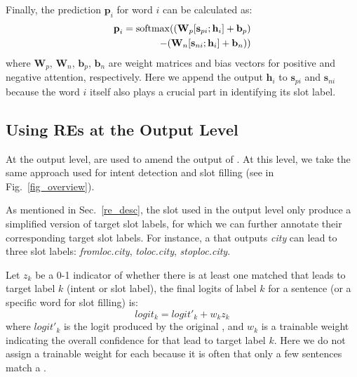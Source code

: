 Finally, the prediction $\textbf{p}_i$ for word $i$ can be calculated as:
\begin{equation}
\begin{split}
\textbf{p}_i = \operatorname{softmax}((\textbf{W}_p [\textbf{s}_{pi}; \textbf{h}_i] + \textbf{b}_p) \\- (\textbf{W}_n [\textbf{s}_{ni}; \textbf{h}_i] + \textbf{b}_n))
\end{split}
\end{equation}
where $\textbf{W}_{p}$, $\textbf{W}_{n}$, $\textbf{b}_{p}$, $\textbf{b}_{n}$ are weight matrices and bias vectors for positive and negative attention, respectively. Here we append the \BLSTM output $\textbf{h}_i$ to $\textbf{s}_{pi}$ and $\textbf{s}_{ni}$ because the word $i$ itself also plays a crucial part in identifying its slot label.

\subsection{Using REs at the Output Level}
\label{fusion_with_output} At the output level, \REs are used to amend the output of \NNs. At this level, we take the same approach used
for intent detection and slot filling (see  in Fig.~\ref{fig_overview}).


As mentioned in Sec.~\ref{re_desc}, the slot \REs used in the output level only produce a simplified version of target slot labels, for which
we can further
annotate their corresponding target slot labels.
For instance, a \RE that outputs \emph{city} can lead to three slot labels: \emph{fromloc.city}, \emph{toloc.city},
\emph{stoploc.city}.

Let $z_k$ be a 0-1 indicator of whether there is at least one matched \RE that leads to target label $k$ (intent or slot label), the final
logits of label $k$ for a sentence (or a specific word for slot filling) is:
\begin{equation}
logit_k = logit'_k + w_k z_k
\end{equation}
where $logit'_k$ is the logit produced by the original \NN, and $w_k$ is a trainable weight indicating the overall confidence for \REs that
lead to target label $k$. Here we do not assign a trainable weight for each \RE because it is often that only a few sentences match a \RE.


